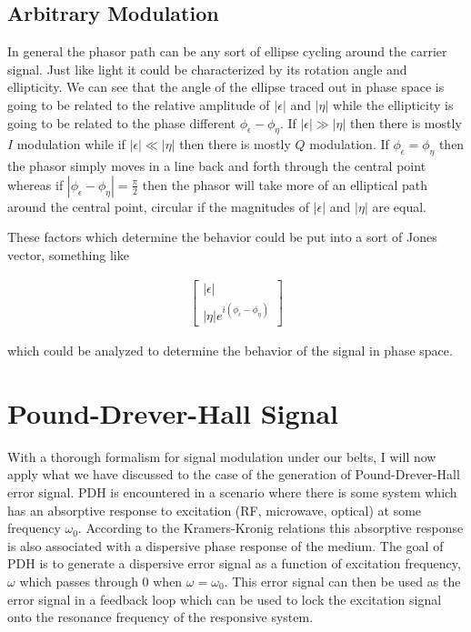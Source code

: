 \documentclass[12pt]{article}
\newcommand{\ep}{\epsilon}
\begin{document}
\subsection{Arbitrary Modulation}
In general the phasor path can be any sort of ellipse cycling around the carrier signal. Just like light it could be characterized by its rotation angle and ellipticity. We can see that the angle of the ellipse traced out in phase space is going to be related to the relative amplitude of $|\ep|$ and $|\eta|$ while the ellipticity is going to be related to the phase different $\phi_{\ep}-\phi_{\eta}$. If $|\ep|\gg |\eta|$ then there is mostly $I$ modulation while if $|\ep|\ll |\eta|$ then there is mostly $Q$ modulation. If $\phi_{\ep} = \phi_{\eta}$ then the phasor simply moves in a line back and forth through the central point whereas if $|\phi_{\ep} - \phi_{\eta}| = \frac{\pi}{2}$ then the phasor will take more of an elliptical path around the central point, circular if the magnitudes of $|\ep|$ and $|\eta|$ are equal.

These factors which determine the behavior could be put into a sort of Jones vector, something like

\begin{align}
\begin{bmatrix}
|\ep|\\
|\eta|e^{i(\phi_{\ep} - \phi_{\eta})}
\end{bmatrix}
\end{align}

which could be analyzed to determine the behavior of the signal in phase space.

\section{Pound-Drever-Hall Signal}

With a thorough formalism for signal modulation under our belts, I will now apply what we have discussed to the case of the generation of Pound-Drever-Hall error signal. PDH is encountered in a scenario where there is some system which has an absorptive response to excitation (RF, microwave, optical) at some frequency $\omega_0$. According to the Kramers-Kronig relations this absorptive response is also associated with a dispersive phase response of the medium. The goal of PDH is to generate a dispersive error signal as a function of excitation frequency, $\omega$ which passes through 0 when $\omega=\omega_0$. This error signal can then be used as the error signal in a feedback loop which can be used to lock the excitation signal onto the resonance frequency of the responsive system.
\end{document}
